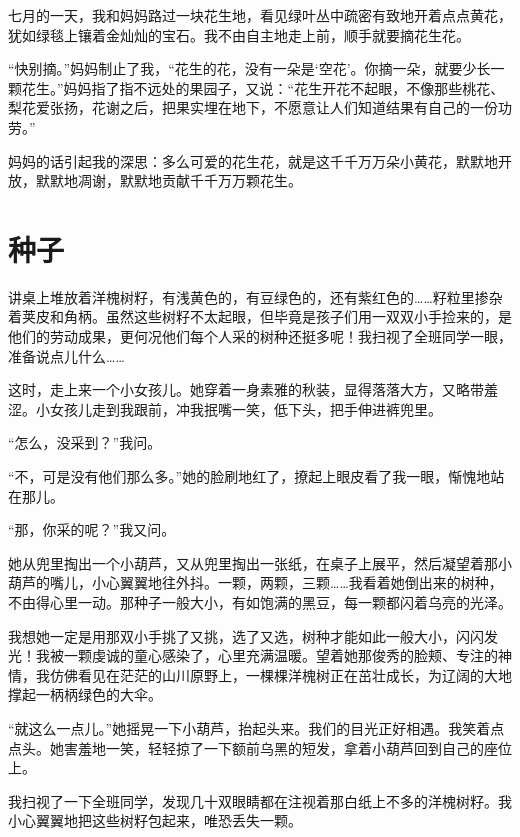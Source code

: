 \documentclass[12pt,UTF-8,openany]{ctexbook}
\begin{document}
\begin{large}
    
    七月的一天，我和妈妈路过一块花生地，看见绿叶丛中疏密有致地开着点点黄花，犹如绿毯上镶着金灿灿的宝石。我不由自主地走上前，顺手就要摘花生花。
    
    “快别摘。”妈妈制止了我，“花生的花，没有一朵是‘空花’。你摘一朵，就要少长一颗花生。”妈妈指了指不远处的果园子，又说：“花生开花不起眼，不像那些桃花、梨花爱张扬，花谢之后，把果实埋在地下，不愿意让人们知道结果有自己的一份功劳。”
    
    妈妈的话引起我的深思：多么可爱的花生花，就是这千千万万朵小黄花，默默地开放，默默地凋谢，默默地贡献千千万万颗花生。
    
\end{large}



\chapter{种子}

\begin{large}
    
    讲桌上堆放着洋槐树籽，有浅黄色的，有豆绿色的，还有紫红色的……籽粒里掺杂着荚皮和角柄。虽然这些树籽不太起眼，但毕竟是孩子们用一双双小手捡来的，是他们的劳动成果，更何况他们每个人采的树种还挺多呢！我扫视了全班同学一眼，准备说点儿什么……
    
    这时，走上来一个小女孩儿。她穿着一身素雅的秋装，显得落落大方，又略带羞涩。小女孩儿走到我跟前，冲我抿嘴一笑，低下头，把手伸进裤兜里。
    
    “怎么，没采到？”我问。
    
    “不，可是没有他们那么多。”她的脸刷地红了，撩起上眼皮看了我一眼，惭愧地站在那儿。
    
    “那，你采的呢？”我又问。
    
    她从兜里掏出一个小葫芦，又从兜里掏出一张纸，在桌子上展平，然后凝望着那小葫芦的嘴儿，小心翼翼地往外抖。一颗，两颗，三颗……我看着她倒出来的树种，不由得心里一动。那种子一般大小，有如饱满的黑豆，每一颗都闪着乌亮的光泽。
    
    我想她一定是用那双小手挑了又挑，选了又选，树种才能如此一般大小，闪闪发光！我被一颗虔诚的童心感染了，心里充满温暖。望着她那俊秀的脸颊、专注的神情，我仿佛看见在茫茫的山川原野上，一棵棵洋槐树正在茁壮成长，为辽阔的大地撑起一柄柄绿色的大伞。
    
    “就这么一点儿。”她摇晃一下小葫芦，抬起头来。我们的目光正好相遇。我笑着点点头。她害羞地一笑，轻轻掠了一下额前乌黑的短发，拿着小葫芦回到自己的座位上。
    
    我扫视了一下全班同学，发现几十双眼睛都在注视着那白纸上不多的洋槐树籽。我小心翼翼地把这些树籽包起来，唯恐丢失一颗。
    
\end{large}
\end{document}
